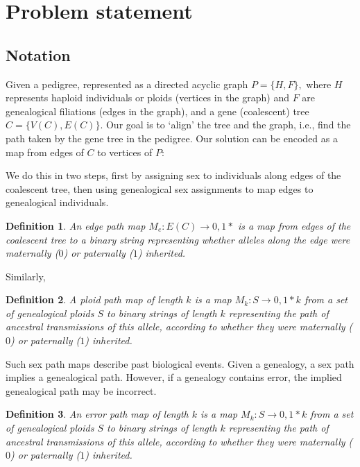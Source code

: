 \documentclass[14pt]{extarticle}
\newtheorem{definition}{Definition}
\begin{document}
\section{Problem statement}

\subsection{Notation}

Given a pedigree, represented as a directed acyclic graph $P = \{H, F\},$ where $H$ represents haploid individuals or ploids (vertices in the graph) and $F$ are genealogical filiations (edges in the graph), and a gene (coalescent) tree $C = \{V(C), E(C)\}.$ Our goal is to `align' the tree and the graph, i.e., find the path taken by the gene tree in the pedigree. Our solution can be encoded as a map from edges of $C$ to vertices of $P$:

We do this in two steps, first by assigning sex to individuals along edges of the coalescent tree, then using genealogical sex assignments to map edges to genealogical individuals.  

\begin{definition}
An edge path map $M_e:E(C) \rightarrow {0,1}*$ is a map from edges of the coalescent tree to a binary string representing whether alleles along the edge were maternally ($0$) or paternally ($1$) inherited.     
\end{definition}

Similarly, 
\begin{definition}
A ploid path map of length $k$ is a map $M_k:S \rightarrow {0,1}*k$ from a set of genealogical ploids $S$ to binary strings of length $k$ representing the path of ancestral transmissions of this allele, according to whether they were maternally ($0$) or paternally ($1$) inherited.      
\end{definition}

Such sex path maps describe past biological events. Given a genealogy, a sex path implies a genealogical path. However, if a genealogy contains error, the implied genealogical path may be incorrect. 

\begin{definition}
An error path map of length $k$ is a map $M_k:S \rightarrow {0,1}*k$ from a set of genealogical ploids $S$ to binary strings of length $k$ representing the path of ancestral transmissions of this allele, according to whether they were maternally ($0$) or paternally ($1$) inherited.      
\end{definition}
\end{document}
